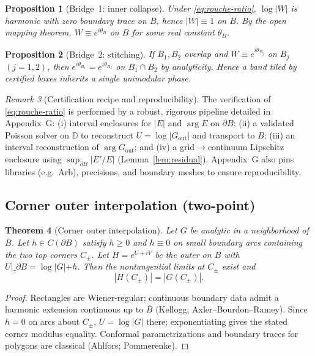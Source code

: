 \documentclass[11pt]{article}
\numberwithin{equation}{section}
\newtheorem{theorem}{Theorem}[section]
\newtheorem{proposition}[theorem]{Proposition}
\theoremstyle{remark}
\newtheorem{remark}[theorem]{Remark}
\newcommand{\D}{\mathbb{D}}
\newcommand{\Gout}{G_{\mathrm{out}}}
\begin{document}
\begin{proposition}[Bridge~1: inner collapse]\label{prop:bridge1}
Under \eqref{eq:rouche-ratio}, $\log|W|$ is harmonic with zero boundary trace on $B$, hence $|W|\equiv 1$ on $B$. By the open mapping theorem, $W\equiv e^{i\theta_B}$ on $B$ for some real constant $\theta_B$.
\end{proposition}

\begin{proposition}[Bridge~2: stitching]\label{prop:bridge2}
If $B_1,B_2$ overlap and $W\equiv e^{i\theta_{B_j}}$ on $B_j$ $(j=1,2)$, then $e^{i\theta_{B_1}}=e^{i\theta_{B_2}}$ on $B_1\cap B_2$ by analyticity. Hence a band tiled by certified boxes inherits a single unimodular phase.
\end{proposition}

\begin{remark}[Certification recipe and reproducibility]
The verification of \eqref{eq:rouche-ratio} is performed by a robust, rigorous pipeline detailed in Appendix~G: (i) interval enclosures for $|E|$ and $\arg E$ on $\partial B$; (ii) a validated Poisson solver on $\D$ to reconstruct $U=\log|\Gout|$ and transport to $B$; (iii) an interval reconstruction of $\arg\Gout$; and (iv) a grid$\to$continuum Lipschitz enclosure using $\sup_{\partial B}|E'/E|$ (Lemma~\ref{lem:residual}). Appendix~G also pins libraries (e.g.\ Arb), precisions, and boundary meshes to ensure reproducibility.
\end{remark}

\subsection{Corner outer interpolation (two-point)}\label{subsec:corner-interp}

\begin{theorem}[Corner outer interpolation]\label{thm:corner-outer}
Let $G$ be analytic in a neighborhood of $\overline B$. Let $h\in C(\partial B)$ satisfy $h\ge 0$ and $h\equiv 0$ on small boundary arcs containing the two top corners $C_\pm$. Let $H=e^{U+iV}$ be the outer on $B$ with $U|\_{\partial B}=\log|G|+h$. Then the nontangential limits at $C_\pm$ exist and
\[
|H(C_\pm)|=|G(C_\pm)|.
\]
\end{theorem}

\begin{proof}
Rectangles are Wiener-regular; continuous boundary data admit a harmonic extension continuous up to $\overline B$ (Kellogg; Axler--Bourdon--Ramey). Since $h=0$ on arcs about $C_\pm$, $U=\log|G|$ there; exponentiating gives the stated corner modulus equality. Conformal parametrizations and boundary traces for polygons are classical (Ahlfors; Pommerenke).
\end{proof}
\end{document}
